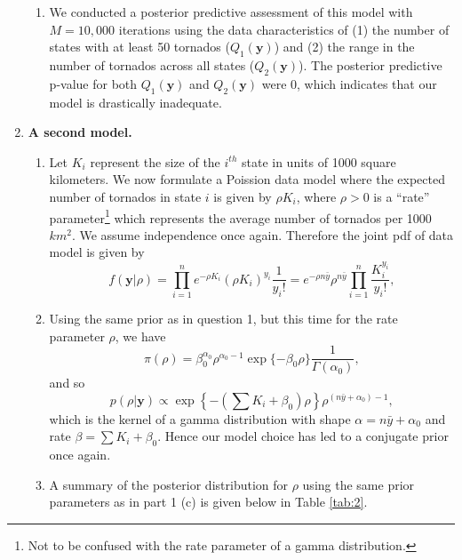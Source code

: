 \documentclass[12pt]{article}
\begin{document}
\begin{enumerate}[leftmargin=*]
\begin{enumerate}[leftmargin=1mm]
      \item We conducted a posterior predictive assessment of this model with $M = 10,000$ iterations 
        using the data characteristics of (1) the number of states with at least 50
        tornados ($Q_1(\bm{y})$) and (2) the range in the number of tornados across all states ($Q_2(\bm{y})$). The posterior predictive p-value for
        both $Q_1(\bm{y})$ and $Q_2(\bm{y})$ were 0, which indicates that our model is drastically inadequate.

    \end{enumerate}

    \newpage
  \item \textbf{A second model.}
    \begin{enumerate}[leftmargin=1mm]
      \item Let $K_i$ represent the size of the $i^{th}$ state in units of 1000 square kilometers. We now formulate a Poission data model where the 
        expected number of tornados in state $i$ is given by $\rho K_i$, where $\rho > 0$ is a ``rate'' parameter\footnote{Not to be confused with the
        rate parameter of a gamma distribution.} which represents the average number of tornados per 1000 $km^2$.
        We assume independence once again.
        Therefore the joint pdf of data model is given by 
        \[
          f(\bm{y}|\rho) = \prod_{i=1}^{n} e^{-\rho K_i}(\rho K_i)^{y_i} \frac{1}{y_i!} = e^{-\rho n\bar{y}}\rho^{n\bar{y}}
          \prod_{i=1}^{n}\frac{K_i^{y_i}}{y_i!},
        \]

      \item Using the same prior as in question 1, but this time for the rate parameter $\rho$, we have 
        \[
          \pi(\rho) = \beta_0^{\alpha_0}\rho^{\alpha_0 - 1}\exp\{-\beta_0\rho\} \frac{1}{\Gamma(\alpha_0)},
        \]
        and so
        \[
          p(\rho|\bm{y}) \propto \exp\left\{-\left(\sum K_i + \beta_0\right)\rho\right\} \rho^{(n\bar{y} + \alpha_0) - 1},
        \]
        which is the kernel of a gamma distribution with shape $\alpha = n\bar{y} + \alpha_0$ and rate $\beta = \sum K_i + \beta_0$.
        Hence our model choice has led to a conjugate prior once again.

      \item A summary of the posterior distribution for $\rho$ using the same prior parameters as in part 1 (c) is given below in Table \ref{tab:2}.


\end{enumerate}
\end{enumerate}
\end{document}
